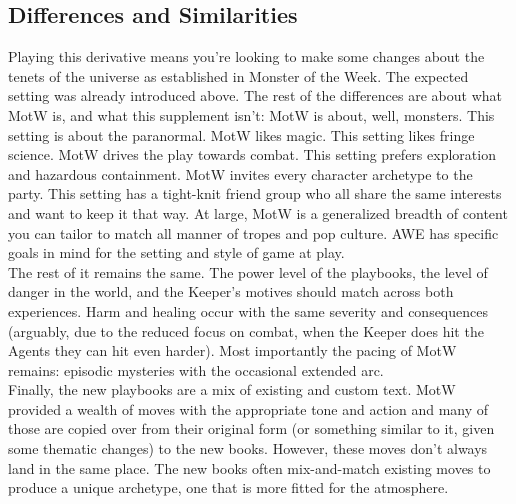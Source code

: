 \documentclass[10pt,oneside,landscape]{memoir}
\begin{document}
\begin{multicols}{2}
\section*{Differences and Similarities}
Playing this derivative means you’re looking to make some changes about the tenets of the universe as established in Monster of the Week.  The expected setting was already introduced above.  The rest of the differences are about what MotW is, and what this supplement isn’t:  MotW is about, well, monsters.  This setting is about the paranormal.  MotW likes magic.  This setting likes fringe science.  MotW drives the play towards combat.  This setting prefers exploration and hazardous containment.  MotW invites every character archetype to the party.  This setting has a tight-knit friend group who all share the same interests and want to keep it that way.  At large, MotW is a generalized breadth of content you can tailor to match all manner of tropes and pop culture.  AWE has specific goals in mind for the setting and style of game at play.
\\[4mm]
The rest of it remains the same.  The power level of the playbooks, the level of danger in the world, and the Keeper’s motives should match across both experiences.  Harm and healing occur with the same severity and consequences (arguably, due to the reduced focus on combat, when the Keeper does hit the Agents they can hit even harder).  Most importantly the pacing of MotW remains: episodic mysteries with the occasional extended arc.
\\[4mm]
Finally, the new playbooks are a mix of existing and custom text.  MotW provided a wealth of moves with the appropriate tone and action and many of those are copied over from their original form (or something similar to it, given some thematic changes) to the new books.  However, these moves don’t always land in the same place.  The new books often mix-and-match existing moves to produce a unique archetype, one that is more fitted for the atmosphere.


\end{multicols}
\end{document}
